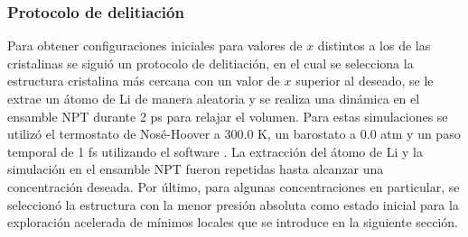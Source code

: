 \subsubsection{Protocolo de delitiación}

Para obtener configuraciones iniciales para valores de $x$ distintos a los de las 
cristalinas se siguió un protocolo de delitiación, en el cual se selecciona la 
estructura cristalina más cercana con un valor de $x$ superior al deseado,
se le extrae un átomo de Li de manera aleatoria y se realiza una dinámica en el 
ensamble NPT durante 2 ps para relajar el volumen. Para estas simulaciones se 
utilizó el termostato de Nosé-Hoover \cite{nose1984a, nose1984b, hoover1985} a
300.0 K, un barostato a 0.0 atm y un paso temporal de 1 fs utilizando el
software  \cite{lammps1, lammps2}. La extracción del átomo de Li y
la simulación en el ensamble NPT fueron repetidas hasta alcanzar una concentración
deseada. Por último, para algunas concentraciones en particular, se seleccionó la
estructura con la menor presión absoluta como estado inicial para la exploración 
acelerada de mínimos locales que se introduce en la siguiente sección.
